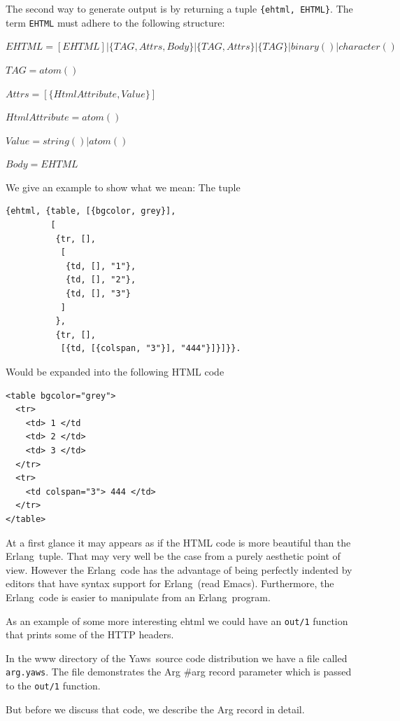 \documentclass[11pt,oneside,english]{book}
\newcommand{\Erlang}            %
        {{\sc Erlang}}
\newcommand{\Yaws}            %
        {{\sc Yaws}}
\begin{document}
The second way to generate output is by returning a tuple
\verb+{ehtml, EHTML}+. The term \verb+EHTML+ must adhere to the
following structure:

$EHTML = [EHTML] | \{TAG, Attrs, Body\} |
                   \{TAG, Attrs\} | \{TAG\} |
        binary() | character()$

$TAG         = atom()$

$Attrs = [\{HtmlAttribute, Value\}]$

$HtmlAttribute   = atom()$

$Value = string() | atom()$

$Body  = EHTML$

We give an example to show what we mean:
The tuple
\begin{verbatim}
{ehtml, {table, [{bgcolor, grey}],
         [
          {tr, [],
           [
            {td, [], "1"},
            {td, [], "2"},
            {td, [], "3"}
           ]
          },
          {tr, [],
           [{td, [{colspan, "3"}], "444"}]}]}}.
\end{verbatim}

Would be expanded into the following HTML code
\begin{verbatim}
<table bgcolor="grey">
  <tr>
    <td> 1 </td
    <td> 2 </td>
    <td> 3 </td>
  </tr>
  <tr>
    <td colspan="3"> 444 </td>
  </tr>
</table>

\end{verbatim}

At a first glance it may appears as if the HTML code is more
beautiful than the \Erlang\  tuple. That may very well be the
case from a purely aesthetic point of view. However the
\Erlang\  code has the advantage of being perfectly indented by editors
that have syntax support for \Erlang\  (read Emacs). Furthermore, the \Erlang\
code is easier to manipulate from an \Erlang\  program.

As an example of some more interesting ehtml we could have
an \verb+out/1+ function that prints some of the HTTP headers.

In the www directory of the \Yaws\  source code distribution we have
a file called \verb+arg.yaws+. The file demonstrates the Arg \#arg record
parameter which is passed to the \verb+out/1+ function.


But before we discuss that code, we describe the Arg record
in detail.
\end{document}
